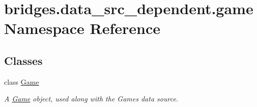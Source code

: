 \hypertarget{namespacebridges_1_1data__src__dependent_1_1game}{}\section{bridges.\+data\+\_\+src\+\_\+dependent.\+game Namespace Reference}
\label{namespacebridges_1_1data__src__dependent_1_1game}
\subsection*{Classes}
\begin{DoxyCompactItemize}
\item 
class \hyperlink{classbridges_1_1data__src__dependent_1_1game_1_1_game}{Game}
\begin{DoxyCompactList}\small\item\em A \hyperlink{classbridges_1_1data__src__dependent_1_1game_1_1_game}{Game} object, used along with the Games data source. \end{DoxyCompactList}\end{DoxyCompactItemize}
